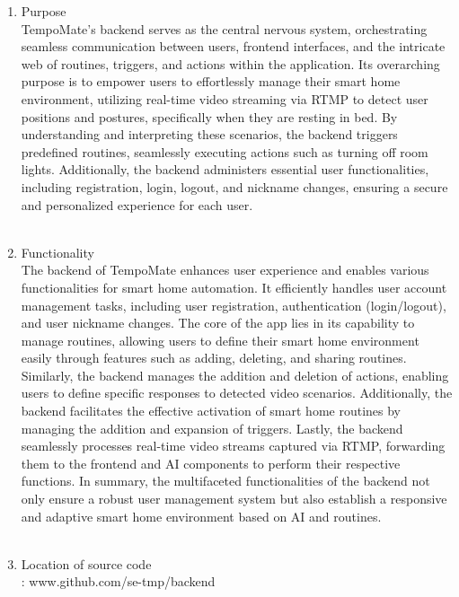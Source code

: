                     \begin{enumerate}
                        \item Purpose \\
                              TempoMate's backend serves as the central nervous system, orchestrating seamless communication between users, frontend interfaces, and the intricate web of routines, triggers, and actions within the application. Its overarching purpose is to empower users to effortlessly manage their smart home environment, utilizing real-time video streaming via RTMP to detect user positions and postures, specifically when they are resting in bed. By understanding and interpreting these scenarios, the backend triggers predefined routines, seamlessly executing actions such as turning off room lights. Additionally, the backend administers essential user functionalities, including registration, login, logout, and nickname changes, ensuring a secure and personalized experience for each user. \\\\

                        \item Functionality \\
                              The backend of TempoMate enhances user experience and enables various functionalities for smart home automation. It efficiently handles user account management tasks, including user registration, authentication (login/logout), and user nickname changes. The core of the app lies in its capability to manage routines, allowing users to define their smart home environment easily through features such as adding, deleting, and sharing routines. Similarly, the backend manages the addition and deletion of actions, enabling users to define specific responses to detected video scenarios. Additionally, the backend facilitates the effective activation of smart home routines by managing the addition and expansion of triggers. Lastly, the backend seamlessly processes real-time video streams captured via RTMP, forwarding them to the frontend and AI components to perform their respective functions. In summary, the multifaceted functionalities of the backend not only ensure a robust user management system but also establish a responsive and adaptive smart home environment based on AI and routines. \\\\

                        \item Location of source code \\
                              : www.github.com/se-tmp/backend \\\\


\end{enumerate}
